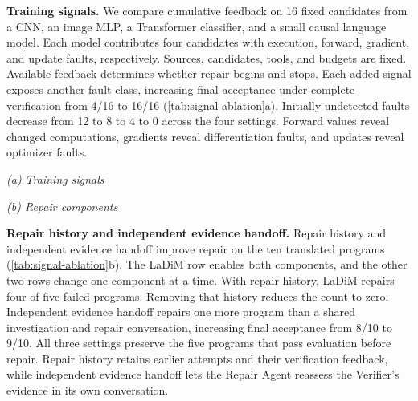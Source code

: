 \textbf{Training signals.} We compare cumulative feedback on 16 fixed candidates from a CNN, an image MLP, a Transformer classifier, and a small causal language model. Each model contributes four candidates with execution, forward, gradient, and update faults, respectively. Sources, candidates, tools, and budgets are fixed. Available feedback determines whether repair begins and stops. Each added signal exposes another fault class, increasing final acceptance under complete verification from 4/16 to 16/16 (\cref{tab:signal-ablation}a). Initially undetected faults decrease from 12 to 8 to 4 to 0 across the four settings. Forward values reveal changed computations, gradients reveal differentiation faults, and updates reveal optimizer faults.
\begin{table}[!t]
\caption{Training signals and repair components. (a) Cumulative signals on 16 faulty candidates, scored with complete verification. Each $+$ adds a signal. (b) Repair history and evidence handoff on ten translations, where parentheses count repairs among five failing programs. (c) Repository components on time series. All settings pass 69 checks across three seeds. Tokens are in millions.}
\label{tab:signal-ablation}
\label{tab:cumulative-components}
\centering
\small
\setlength{\tabcolsep}{3pt}
\begin{minipage}[t]{0.495\linewidth}
\vspace{0pt}
{\raggedright\textit{(a) Training signals}\par}\smallskip

\end{minipage}\hfill
\begin{minipage}[t]{0.495\linewidth}
\vspace{0pt}
{\raggedright\textit{(b) Repair components}\par}\smallskip

\end{minipage}
\par\smallskip

\par\vspace{-8pt}
\end{table}

\textbf{Repair history and independent evidence handoff.} Repair history and independent evidence handoff improve repair on the ten translated programs (\cref{tab:signal-ablation}b). The LaDiM row enables both components, and the other two rows change one component at a time. With repair history, LaDiM repairs four of five failed programs. Removing that history reduces the count to zero. Independent evidence handoff repairs one more program than a shared investigation and repair conversation, increasing final acceptance from 8/10 to 9/10. All three settings preserve the five programs that pass evaluation before repair. Repair history retains earlier attempts and their verification feedback, while independent evidence handoff lets the Repair Agent reassess the Verifier's evidence in its own conversation.

